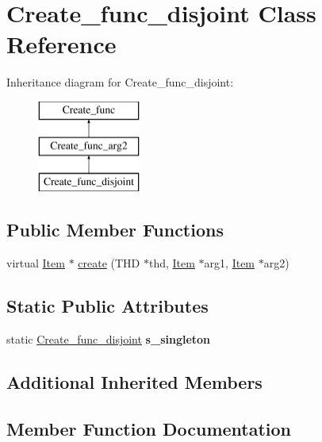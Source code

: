 \hypertarget{classCreate__func__disjoint}{}\section{Create\+\_\+func\+\_\+disjoint Class Reference}
\label{classCreate__func__disjoint}
Inheritance diagram for Create\+\_\+func\+\_\+disjoint\+:\begin{figure}[H]
\begin{center}
\leavevmode
\includegraphics[height=3.000000cm]{classCreate__func__disjoint}
\end{center}
\end{figure}
\subsection*{Public Member Functions}
\begin{DoxyCompactItemize}
\item 
virtual \mbox{\hyperlink{classItem}{Item}} $\ast$ \mbox{\hyperlink{classCreate__func__disjoint_a0639f3a4f011700c1d7615f2fc8447f4}{create}} (T\+HD $\ast$thd, \mbox{\hyperlink{classItem}{Item}} $\ast$arg1, \mbox{\hyperlink{classItem}{Item}} $\ast$arg2)
\end{DoxyCompactItemize}
\subsection*{Static Public Attributes}
\begin{DoxyCompactItemize}
\item 
\mbox{\label{classCreate__func__disjoint_a9ea6a1c4e1c8ebe071accee5c94d4201}} 
static \mbox{\hyperlink{classCreate__func__disjoint}{Create\+\_\+func\+\_\+disjoint}} {\bfseries s\+\_\+singleton}
\end{DoxyCompactItemize}
\subsection*{Additional Inherited Members}


\subsection{Member Function Documentation}
\mbox{\label{classCreate__func__disjoint_a0639f3a4f011700c1d7615f2fc8447f4}} 
